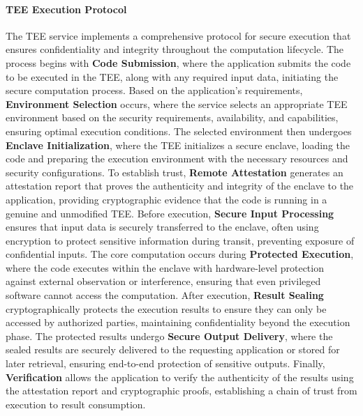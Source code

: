 \documentclass[11pt]{article}
\begin{document}
\paragraph{TEE Execution Protocol}
The TEE service implements a comprehensive protocol for secure execution that ensures confidentiality and integrity throughout the computation lifecycle. The process begins with \textbf{Code Submission}, where the application submits the code to be executed in the TEE, along with any required input data, initiating the secure computation process. Based on the application's requirements, \textbf{Environment Selection} occurs, where the service selects an appropriate TEE environment based on the security requirements, availability, and capabilities, ensuring optimal execution conditions. The selected environment then undergoes \textbf{Enclave Initialization}, where the TEE initializes a secure enclave, loading the code and preparing the execution environment with the necessary resources and security configurations. To establish trust, \textbf{Remote Attestation} generates an attestation report that proves the authenticity and integrity of the enclave to the application, providing cryptographic evidence that the code is running in a genuine and unmodified TEE. Before execution, \textbf{Secure Input Processing} ensures that input data is securely transferred to the enclave, often using encryption to protect sensitive information during transit, preventing exposure of confidential inputs. The core computation occurs during \textbf{Protected Execution}, where the code executes within the enclave with hardware-level protection against external observation or interference, ensuring that even privileged software cannot access the computation. After execution, \textbf{Result Sealing} cryptographically protects the execution results to ensure they can only be accessed by authorized parties, maintaining confidentiality beyond the execution phase. The protected results undergo \textbf{Secure Output Delivery}, where the sealed results are securely delivered to the requesting application or stored for later retrieval, ensuring end-to-end protection of sensitive outputs. Finally, \textbf{Verification} allows the application to verify the authenticity of the results using the attestation report and cryptographic proofs, establishing a chain of trust from execution to result consumption.
\end{document}
